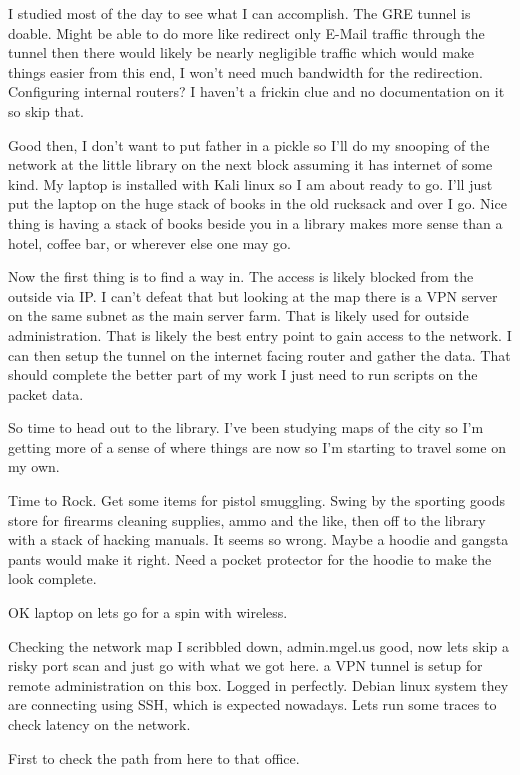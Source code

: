 I studied most of the day to see what I can accomplish. The GRE tunnel is doable. Might be able to do more like redirect only E-Mail traffic through the tunnel then there would likely be nearly negligible traffic which would make things easier from this end, I won't need much bandwidth for the redirection. Configuring internal routers? I haven't a frickin clue and no documentation on it so skip that.

Good then, I don't want to put father in a pickle so I'll do my snooping of the network at the little library on the next block assuming it has internet of some kind. My laptop is installed with Kali linux so I am about ready to go. I'll just put the laptop on the huge stack of books in the old rucksack and over I go. Nice thing is having a stack of books beside you in a library makes more sense than a hotel, coffee bar, or wherever else one may go.

Now the first thing is to find a way in. The access is likely blocked from the outside via IP. I can't defeat that but looking at the map there is a VPN server on the same subnet as the main server farm. That is likely used for outside administration. That is likely the best entry point to gain access to the network. I can then setup the tunnel on the internet facing router and gather the data. That should complete the better part of my work I just need to run scripts on the packet data.

So time to head out to the library. I've been studying maps of the city so I'm getting more of a sense of where things are now so I'm starting to travel some on my own. 

Time to Rock. Get some items for pistol smuggling. Swing by the sporting goods store for firearms cleaning supplies, ammo and the like, then off to the library with a stack of hacking manuals. It seems so wrong. Maybe a hoodie and gangsta pants would make it right. Need a pocket protector for the hoodie to make the look complete.

OK laptop on lets go for a spin with wireless.

Checking the network map I scribbled down, admin.mgel.us good, now lets skip a risky port scan and just go with what we got here. a VPN tunnel is setup for remote administration on this box. Logged in perfectly. Debian linux system they are connecting using SSH, which is expected nowadays. Lets run some traces to check latency on the network.\\
\bigskip

First to check the path from here to that office.

